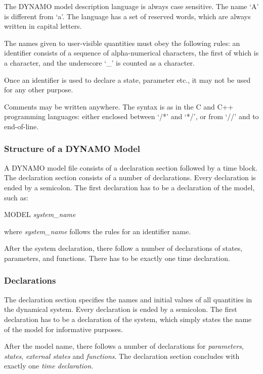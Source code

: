 The DYNAMO model description language is always case sensitive. The name
`A' is different from `a'. The language has a set of
reserved words, which are always written in capital letters.

The names given to user-visible quantities must obey the following
rules: an identifier consists of a sequence of alpha-numerical
characters, the first of which is a character, and the underscore
`\_' is counted as a character.

Once an identifier is used to declare a state, parameter etc., it
may not be used for any other purpose.

Comments may be written anywhere. The syntax is as in the C and C++
programming languages: either enclosed between `/*' and
`*/', or from `//' and to end-of-line.

\subsubsection{Structure of a DYNAMO Model}

A DYNAMO model file consists of a declaration section followed by a time block. The declaration section consists of a number of declarations. Every declaration is ended by a semicolon. The first declaration has to be a declaration of the model, such as:

\begin{example}
  MODEL \emph{system\_name}
\end{example}

where \emph{system\_name} follows the rules for an identifier name.

After the system declaration, there follow a number of declarations of states, parameters, and functions. There has to be exactly one time declaration.

\subsubsection{Declarations}

The declaration section specifies the names and initial values of all
quantities in the dynamical system. Every declaration is ended by a
semicolon. The first declaration has to be a declaration of the
system, which simply states the name of the model for informative
purposes.  

After the model name, there follows a number of declarations for
\emph{parameters}, \emph{states}, \emph{external states} and
\emph{functions}.  The declaration section concludes with exactly one
\emph{time declaration}.

